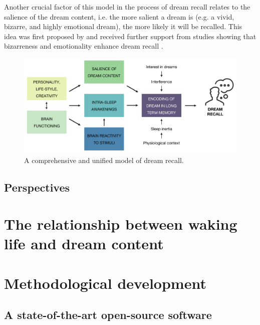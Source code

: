 Another crucial factor of this model in the process of dream recall relates to the salience of the dream content, i.e. the more salient a dream is (e.g. a vivid, bizarre, and highly emotional dream), the more likely it will be recalled. This idea was first proposed by \citet{cohen_test_1974} and received further support from studies showing that bizarreness  and emotionality enhance dream recall \citep{cipolli_bizarreness_1993, schredl_emotions_1998}.


\begin{figure}[!htbp]
	\includegraphics[width=\textwidth]{Fig/Discussion/schema_dream_recall.png}
	\caption[A comprehensive and unified model of dream recall]{A comprehensive and unified model of dream recall.}
	\label{fig:disc:drf:model}
\end{figure}

\section{Perspectives}
\label{disc:drf:perspectives}


\cleardoublepage
\chapter{The relationship between waking life and dream content}
\label{disc:wle}

\cleardoublepage
\chapter{Methodological development}
\label{disc:methods}

\section{A state-of-the-art open-source software}
\label{disc:methods:software}

